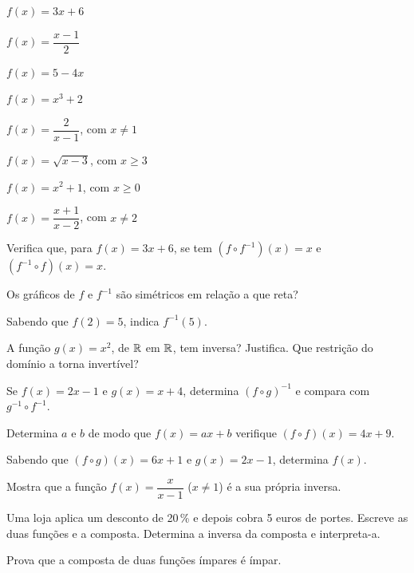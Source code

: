 \documentclass[12pt]{article}
\begin{document}
\begin{exercicios}
  \item $f(x) = 3x + 6$
  \item $f(x) = \dfrac{x - 1}{2}$
  \item $f(x) = 5 - 4x$
  \item $f(x) = x^3 + 2$
  \item $f(x) = \dfrac{2}{x - 1}$, \; com $x \neq 1$
  \item $f(x) = \sqrt{x - 3}$, \; com $x \ge 3$
  \item $f(x) = x^2 + 1$, \; com $x \ge 0$
  \item $f(x) = \dfrac{x + 1}{x - 2}$, \; com $x \neq 2$
\end{exercicios}

\begin{exercicios}
  \item Verifica que, para $f(x) = 3x + 6$, se tem $(f \circ f^{-1})(x) = x$ e $(f^{-1} \circ f)(x) = x$.
  \item Os gráficos de $f$ e $f^{-1}$ são simétricos em relação a que reta?
  \item Sabendo que $f(2) = 5$, indica $f^{-1}(5)$.
  \item A função $g(x) = x^2$, de $\mathbb{R}$ em $\mathbb{R}$, tem inversa? Justifica. Que restrição do domínio a torna invertível?
  \item Se $f(x) = 2x - 1$ e $g(x) = x + 4$, determina $(f \circ g)^{-1}$ e compara com $g^{-1} \circ f^{-1}$.
\end{exercicios}

\begin{exercicios}
  \item Determina $a$ e $b$ de modo que $f(x) = ax + b$ verifique $(f \circ f)(x) = 4x + 9$.
  \item Sabendo que $(f \circ g)(x) = 6x + 1$ e $g(x) = 2x - 1$, determina $f(x)$.
  \item Mostra que a função $f(x) = \dfrac{x}{x - 1}$ ($x \neq 1$) é a sua própria inversa.
  \item Uma loja aplica um desconto de 20\,\% e depois cobra 5 euros de portes. Escreve as duas funções e a composta. Determina a inversa da composta e interpreta-a.
  \item Prova que a composta de duas funções ímpares é ímpar.
\end{exercicios}
\end{document}
